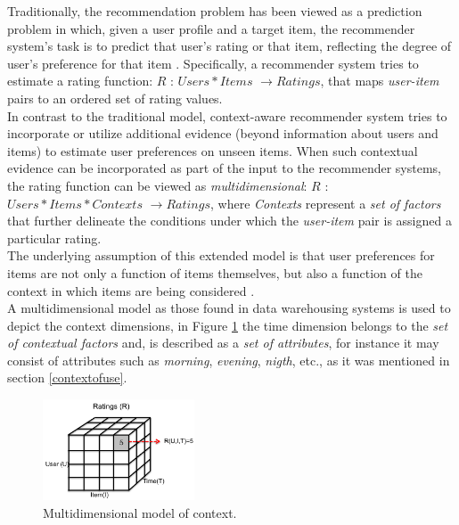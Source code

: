 Traditionally, the recommendation problem has been viewed as a
prediction problem in which, given a user profile and a target item,
the recommender system's task is to predict that user's rating or that
item, reflecting the degree of user's preference for that 
item  \cite{jannach2010recommender}. Specifically, a recommender 
system tries to estimate a rating function: 
$R$ : $Users * Items$ $ \rightarrow Ratings$,  
that maps \textit{user-item} pairs to an ordered  set of rating values.\\
In contrast to the traditional model, context-aware recommender system
tries to incorporate or utilize additional evidence (beyond
information about users and items) to estimate user preferences on
unseen items. When such contextual evidence can be incorporated as
part of the input to the recommender systems, the rating function can
be viewed as \textit{multidimensional}:  $R$ : $Users * Items *
Contexts$ $ \rightarrow Ratings$, where \textit{Contexts} represent a
\textit{set of factors} that further delineate the conditions under which the
\textit{user-item} pair is assigned a particular rating. \\ 
The underlying assumption of this extended model is that 
user preferences for items are not only a function of items 
themselves, but also a  function of the context in which 
items are being considered  \cite{lim2009assessing}. \\
A multidimensional model as those found in data 
warehousing systems  \cite{kimball2011data} is
used to depict the context dimensions, 
in Figure \ref{fig:multidimension}  the time dimension belongs 
to the \textit{set of contextual factors} and, is described as a 
 \textit{set of attributes}, for instance it may consist of
attributes such as \textit{morning}, \textit{evening},  \textit{nigth},
etc., as it was mentioned in section  \ref{contextofuse}. 
\begin{figure}
\captionsetup{font=footnotesize}
\centering
\includegraphics[width=0.40\textwidth]{img/multidimension.png}
\small
\caption{Multidimensional model of context.}
\label{fig:multidimension}   
\end{figure}

